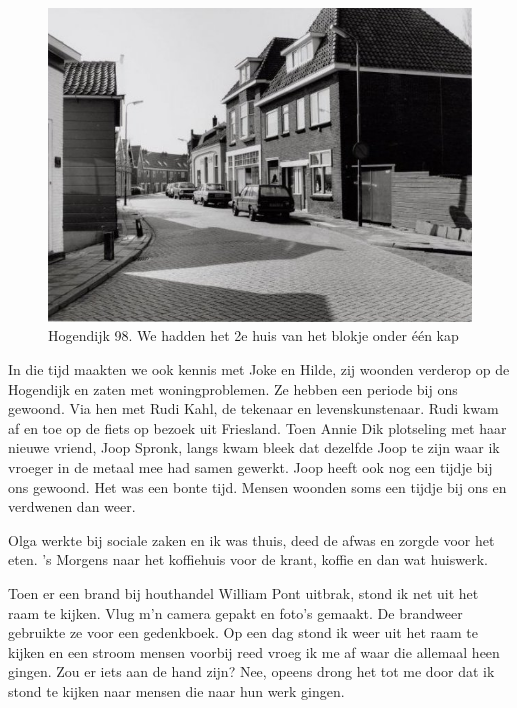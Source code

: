 \documentclass[12pt,twoside, openright]{memoir}
\begin{document}
\begin{figure}
\centering
\includegraphics[width=\textwidth]{img/249huis}
\caption*{\footnotesize Hogendijk 98. We hadden het 2e huis van het blokje onder één kap}
\end{figure}

In die tijd maakten we ook kennis met Joke en Hilde, zij woonden verderop op de Hogendijk en zaten met woningproblemen. Ze hebben een periode bij ons gewoond. Via hen met Rudi Kahl, de tekenaar en levenskunstenaar. Rudi kwam af en toe op de fiets op bezoek uit Friesland. Toen Annie Dik plotseling met haar nieuwe vriend, Joop Spronk, langs kwam bleek dat dezelfde Joop te zijn waar ik vroeger in de metaal mee had samen gewerkt. Joop heeft ook nog een tijdje bij ons gewoond. Het was een bonte tijd. Mensen woonden soms een tijdje bij ons en verdwenen dan weer. 

Olga werkte bij sociale zaken en ik was thuis, deed de afwas en zorgde voor het eten. 's Morgens naar het koffiehuis voor de krant, koffie en dan wat huiswerk. 

Toen er een brand bij houthandel William Pont uitbrak, stond ik net uit het raam te kijken. Vlug m'n camera gepakt en foto's gemaakt. De brandweer gebruikte ze voor een gedenkboek. Op een dag stond ik weer uit het raam te kijken en een stroom mensen voorbij reed vroeg ik  me af waar die allemaal heen gingen. Zou er iets aan de hand zijn? Nee, opeens drong het tot me door dat ik stond te kijken naar mensen die naar hun werk gingen. 
\end{document}
